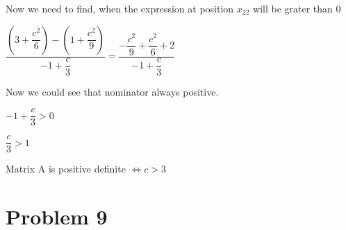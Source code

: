 \documentclass[12pt,letterpaper]{article}
\begin{document}
\begin{enumerate}[label=(\alph*)]
        Now we need to find, when the expression at position $x_{22}$ will be grater than 0
        
        $\dfrac{(3+\dfrac{c^2}{6}) - (1 + \dfrac{c^2}{9})}{-1 + \dfrac{c}{3}} = \dfrac{ -\dfrac{c^2}{9}+\dfrac{c^2}{6} + 2 }{-1 + \dfrac{c}{3}}$
        
        Now we could see that nominator always positive.
        
        $-1 + \dfrac{c}{3} > 0$
        
        $\dfrac{c}{3} > 1$
        
        Matrix A is positive definite $\iff c > 3$
    \end{enumerate}
    
\section*{Problem 9}
\end{document}

